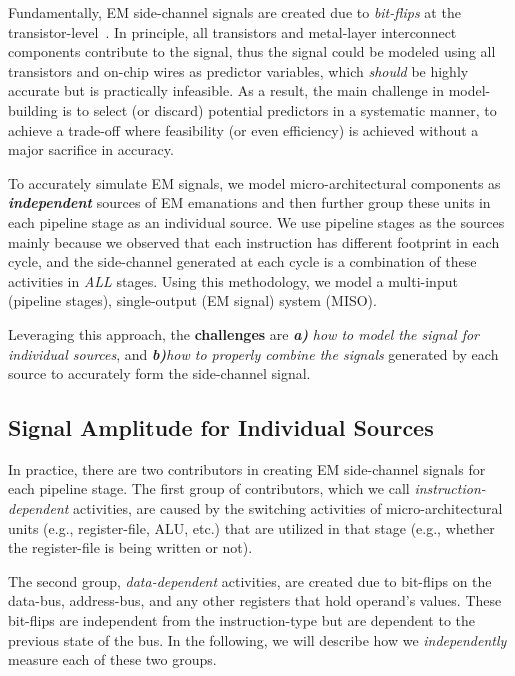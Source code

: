 \documentclass[11 pt]{article}
\begin{document}
Fundamentally, EM side-channel signals are created due to \textit{bit-flips} at the transistor-level~\cite{VANECK1985269,6766222}.
In principle, all transistors and metal-layer interconnect components contribute to the signal, thus the signal could be modeled using all transistors and on-chip wires as predictor variables, which {\em should} be highly accurate but is practically infeasible.
As a result, the main challenge in model-building is to select (or discard) potential predictors in a systematic manner, to achieve a trade-off where feasibility (or even efficiency) is achieved without a major sacrifice in accuracy.

To accurately simulate EM signals, we model micro-architectural components as \textbf{\textit{independent}} sources of EM emanations and then further group these units in each pipeline stage as an individual source. We use pipeline stages as the sources mainly because we observed that each instruction has different footprint in each cycle, and the side-channel generated at each cycle is a combination of these activities in \textit{ALL} stages. Using this methodology, we model a multi-input (pipeline stages), single-output (EM signal) system (MISO).

Leveraging this approach, the \textbf{challenges} are \textbf{\textit{a)}} \textit{how to model the signal for individual sources}, and \textbf{\textit{b)}}\textit{how to properly combine the signals} generated by each source to accurately form the side-channel signal.

\subsection{Signal Amplitude for Individual Sources}
In practice, there are two contributors in creating EM side-channel signals for each pipeline stage. The first group of contributors, which we call \textit{instruction-dependent} activities, are caused by the switching activities of micro-architectural units (e.g., register-file, ALU, etc.) that are utilized in that stage (e.g., whether the register-file is being written or not).

The second group, \textit{data-dependent} activities, are created due to bit-flips on the data-bus, address-bus, and any other registers that hold operand's values. These bit-flips are independent from the instruction-type but are dependent to the previous state of the bus. In the following, we will describe how we \textit{independently} measure each of these two groups. \\
\end{document}
